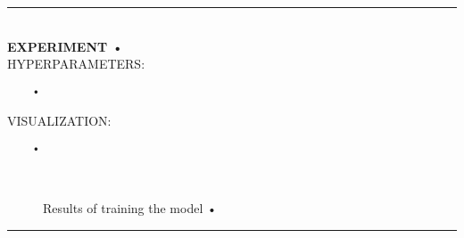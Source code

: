 \rule{0.5\textwidth}{0.5pt}\\

	{\large \textbf{EXPERIMENT •}}\\
	
	{\normalsize HYPERPARAMETERS:}
	\begin{lstlisting}	
	•
	\end{lstlisting}
	
	{\normalsize VISUALIZATION:}
	\begin{lstlisting}
	•
	\end{lstlisting}
	
	\begin{figure*}[ht!]
		\hspace{\fill}
		\hspace{\fill}
		\\
		\caption{Results of training the model •}
	\end{figure*}
	
\FloatBarrier	
\rule{0.5\textwidth}{0.5pt}\\